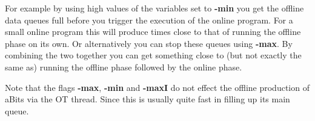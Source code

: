 For example by using high values of the variables set to {\bf -min} you
get the offline data queues full before you trigger the execution
of the online program. For a small online program this will produce
times close to that of running the offline phase on its own.
Or alternatively you can stop these queues using {\bf -max}. By
combining the two together you can get something close to (but not
exactly the same as) running the offline phase followed by the online
phase.

Note that the flags {\bf -max}, {\bf -min} and {\bf -maxI} do
not effect the offline production of aBits via the OT thread. Since
this is usually quite fast in filling up its main queue.
